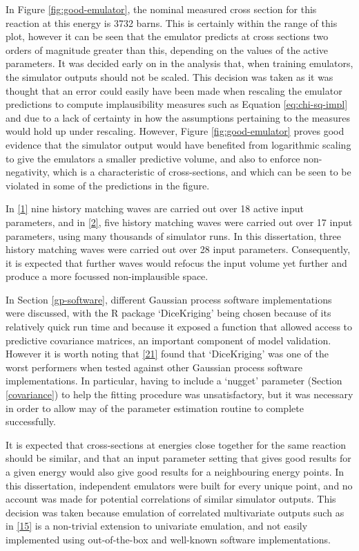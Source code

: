 \documentclass[
  12pt,
  a4paper,
  twoside]{book}
\begin{document}
In Figure \ref{fig:good-emulator}, the nominal measured cross section for this reaction at this energy is 3732 barns. This is certainly within the range of this plot, however it can be seen that the emulator predicts at cross sections two orders of magnitude greater than this, depending on the values of the active parameters. It was decided early on in the analysis that, when training emulators, the simulator outputs should not be scaled. This decision was taken as it was thought that an error could easily have been made when rescaling the emulator predictions to compute implausibility measures such as Equation \eqref{eq:chi-sq-impl} and due to a lack of certainty in how the assumptions pertaining to the measures would hold up under rescaling. However, Figure \ref{fig:good-emulator} proves good evidence that the simulator output would have benefited from logarithmic scaling to give the emulators a smaller predictive volume, and also to enforce non-negativity, which is a characteristic of cross-sections, and which can be seen to be violated in some of the predictions in the figure.

In \protect\hyperlink{ref-jeremy_histmatch}{{[}1{]}} nine history matching waves are carried out over 18 active input parameters, and in \protect\hyperlink{ref-bower2010galaxy}{{[}2{]}}, five history matching waves were carried out over 17 input parameters, using many thousands of simulator runs. In this dissertation, three history matching waves were carried out over 28 input parameters. Consequently, it is expected that further waves would refocus the input volume yet further and produce a more focussed non-implausible space.

In Section \ref{gp-software}, different Gaussian process software implementations were discussed, with the R package `DiceKriging' being chosen because of its relatively quick run time and because it exposed a function that allowed access to predictive covariance matrices, an important component of model validation. However it is worth noting that \protect\hyperlink{ref-gp_comparison}{{[}21{]}} found that `DiceKriging' was one of the worst performers when tested against other Gaussian process software implementations. In particular, having to include a `nugget' parameter (Section \ref{covariance}) to help the fitting procedure was unsatisfactory, but it was necessary in order to allow may of the parameter estimation routine to complete successfully.

It is expected that cross-sections at energies close together for the same reaction should be similar, and that an input parameter setting that gives good results for a given energy would also give good results for a neighbouring energy points. In this dissertation, independent emulators were built for every unique point, and no account was made for potential correlations of similar simulator outputs. This decision was taken because emulation of correlated multivariate outputs such as in \protect\hyperlink{ref-multivariate_gp}{{[}15{]}} is a non-trivial extension to univariate emulation, and not easily implemented using out-of-the-box and well-known software implementations.
\end{document}
